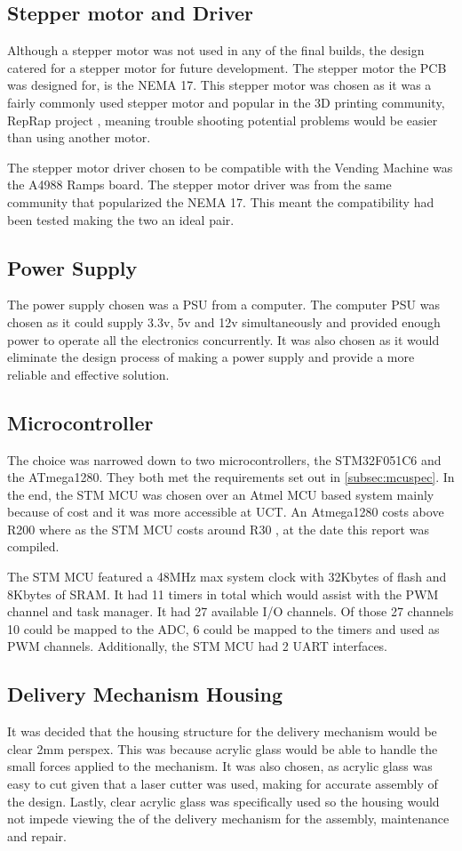 \documentclass[a4paper,11pt]{article}
\newcommand*{\halfref}[1]{\hyperref[{#1}]{\autoref*{#1}}}
\numberwithin{figure}{section}
\numberwithin{table}{section}
\begin{document}
\subsection{Stepper motor and Driver}
Although a stepper motor was not used in any of the final builds, the design catered for a stepper motor for future development. The stepper motor the PCB was designed for, is the NEMA 17. This stepper motor was chosen as it was a fairly commonly used stepper motor and popular in the 3D printing community, RepRap project \cite{reprap}, meaning trouble shooting potential problems would be easier than using another motor.

The stepper motor driver chosen to be compatible with the Vending Machine was the A4988 Ramps board. The stepper motor driver was from the same community that popularized the NEMA 17. This meant the compatibility had been tested making the two an ideal pair.

\subsection{Power Supply}
The power supply chosen was a PSU from a computer. The computer PSU was chosen as it could supply 3.3v, 5v and 12v simultaneously and provided enough power to operate all the electronics concurrently. It was also chosen as it would eliminate the design process of making a power supply and provide a more reliable and effective solution.

\subsection{Microcontroller}
The choice was narrowed down to two microcontrollers, the STM32F051C6 and the ATmega1280. They both met the requirements set out in \halfref{subsec:mcuspec}. In the end, the STM MCU was chosen over an Atmel MCU based system mainly because of cost and it was more accessible at UCT. An Atmega1280 costs above R200 where as the STM MCU costs around R30 \cite{rsonline}, at the date this report was compiled. 

The STM MCU featured a 48MHz max system clock with 32Kbytes of flash and 8Kbytes of SRAM. It had 11 timers in total which would assist with the PWM channel and task manager. It had 27 available I/O channels. Of those 27 channels 10 could be mapped to the ADC, 6 could be mapped to the timers and used as PWM channels. Additionally, the STM MCU had 2 UART interfaces.

\subsection{Delivery Mechanism Housing}
It was decided that the housing structure for the delivery mechanism would be clear 2mm perspex. This was because acrylic glass would be able to handle the small forces applied to the mechanism. It was also chosen, as acrylic glass was easy to cut given that a laser cutter was used, making for accurate assembly of the design. Lastly, clear acrylic glass was specifically used so the housing would not impede viewing the of the delivery mechanism for the assembly, maintenance and repair. 
\end{document}
